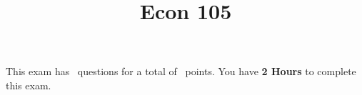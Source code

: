 

\usepackage{color}
\lstset{numbers=left}


\printanswers

\title{Econ 105}
\maketitle



\begin{center}
    This exam has \numquestions\ questions for a total of \numpoints\
    points. You have {\bf 2 Hours} to complete this exam.
\end{center}

%
%
%
%
